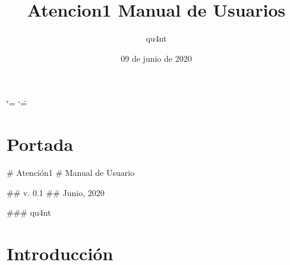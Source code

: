\documentclass[letterpaper,10pt,spanish]{sphinxmanual}
\title{Atencion\sphinxhyphen{}1 Manual de Usuarios}
\date{09 de junio de 2020}
\author{qu4nt}
\begin{document}
\ifdefined\shorthandoff
  \ifnum\catcode`\=\string=\active\shorthandoff{=}\fi
  \ifnum\catcode`\"=\active{}\fi
\fi

\pagestyle{empty}
\sphinxmaketitle
\pagestyle{plain}
\sphinxtableofcontents
\pagestyle{normal}
\label{\detokenize{index::doc}}



\chapter{Portada}
\label{\detokenize{portada:portada}}\label{\detokenize{portada::doc}}
\# Atención\sphinxhyphen{}1
\# Manual de Usuario

\#\# v. 0.1
\#\# Junio, 2020

\#\#\# qu4nt


\chapter{Introducción}
\label{\detokenize{introduccion:introduccion}}\label{\detokenize{introduccion::doc}}
\end{document}
